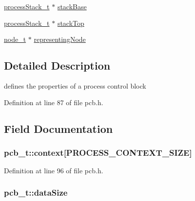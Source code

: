 \begin{DoxyCompactItemize}
\item 
\hyperlink{pcb_8h_a39f696168968032d4df0637fad2ad52c}{process\+Stack\+\_\+t} $\ast$ \hyperlink{structs__pcb__stuct_a3fd35f3889ce588dc9af9b0c74fd2db9}{stack\+Base}
\item 
\hyperlink{pcb_8h_a39f696168968032d4df0637fad2ad52c}{process\+Stack\+\_\+t} $\ast$ \hyperlink{structs__pcb__stuct_a8ea780f48f7f2a4f9e337abaf510896e}{stack\+Top}
\item 
\hyperlink{structnode__t}{node\+\_\+t} $\ast$ \hyperlink{structs__pcb__stuct_a56fe193ec1b8061c850d79247bccb98d}{representing\+Node}
\end{DoxyCompactItemize}


\subsection{Detailed Description}
defines the properties of a process control block 

Definition at line 87 of file pcb.\+h.



\subsection{Field Documentation}
\subsubsection[{\texorpdfstring{context}{context}}]{ pcb\+\_\+t\+::context\mbox{[}{\bf P\+R\+O\+C\+E\+S\+S\+\_\+\+C\+O\+N\+T\+E\+X\+T\+\_\+\+S\+I\+ZE}\mbox{]}}\hypertarget{structs__pcb__stuct_a54d339e4c45de597429888e4654c03c8}{}\label{structs__pcb__stuct_a54d339e4c45de597429888e4654c03c8}


Definition at line 96 of file pcb.\+h.

\subsubsection[{\texorpdfstring{data\+Size}{dataSize}}]{ pcb\+\_\+t\+::data\+Size}\hypertarget{structs__pcb__stuct_aaaf251e1893020160fb154a5e341f604}{}\label{structs__pcb__stuct_aaaf251e1893020160fb154a5e341f604}


